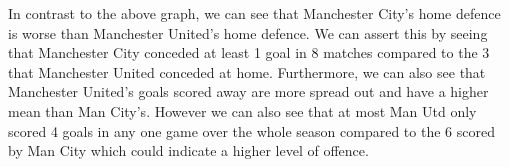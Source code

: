 \documentclass[12pt]{report}
\begin{document}
In contrast to the above graph, we can see that Manchester City's home defence is worse than Manchester United's home defence. We can assert this by seeing that Manchester City conceded at least 1 goal in 8 matches compared to the 3 that Manchester United conceded at home. Furthermore, we can also see that Manchester United's goals scored away are more spread out and have a higher mean than Man City's. However we can also see that at most Man Utd only scored 4 goals in any one game over the whole season compared to the 6 scored by Man City which could indicate a higher level of offence. 
\end{document}
